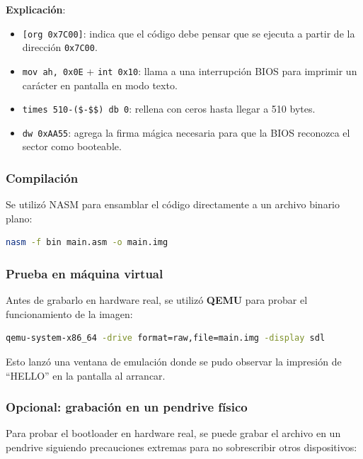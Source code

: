 \textbf{Explicación}:
\begin{itemize}
    \item \texttt{[org 0x7C00]}: indica que el código debe pensar que se ejecuta a partir de la dirección \texttt{0x7C00}.
    \item \texttt{mov ah, 0x0E} + \texttt{int 0x10}: llama a una interrupción BIOS para imprimir un carácter en pantalla en modo texto.
    \item \texttt{times 510-(\$-\$\$) db 0}: rellena con ceros hasta llegar a 510 bytes.
    \item \texttt{dw 0xAA55}: agrega la firma mágica necesaria para que la BIOS reconozca el sector como booteable.
\end{itemize}

\subsubsection{Compilación}

Se utilizó NASM para ensamblar el código directamente a un archivo binario plano:

\begin{lstlisting}[language=bash, caption={Compilación del bootloader}]
nasm -f bin main.asm -o main.img
\end{lstlisting}

\subsubsection{Prueba en máquina virtual}

Antes de grabarlo en hardware real, se utilizó \textbf{QEMU} para probar el funcionamiento de la imagen:

\begin{lstlisting}[language=bash, caption={Ejecución en QEMU}]
qemu-system-x86_64 -drive format=raw,file=main.img -display sdl
\end{lstlisting}

Esto lanzó una ventana de emulación donde se pudo observar la impresión de ``HELLO'' en la pantalla al arrancar.

\subsubsection{Opcional: grabación en un pendrive físico}

Para probar el bootloader en hardware real, se puede grabar el archivo en un pendrive siguiendo precauciones extremas para no sobrescribir otros dispositivos:

